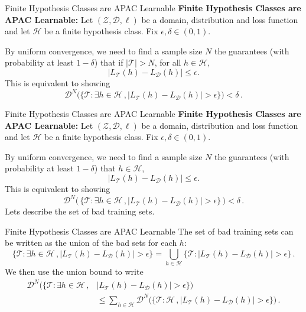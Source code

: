 \documentclass[10pt, table, dvipsnames,handout]{beamer}
\newcommand{\cT}{\ensuremath{\mathcal{T}}}
\newcommand{\cD}{\ensuremath{\mathcal{D}}}
\newcommand{\cH}{\ensuremath{\mathcal{H}}}
\begin{document}
\begin{frame}[fragile]{Finite Hypothesis Classes are APAC Learnable}
\textbf{Finite Hypothesis Classes are APAC Learnable:}
Let $(\mathcal{Z},\cD,\ell)$ be a domain, distribution and loss function and let $\cH$ be a finite hypothesis class. Fix $\epsilon,\delta\in (0,1)$. \pause 

By uniform convergence, we need to find a sample size $N$ the guarantees (with probability at least $1-\delta$) that if $|\mathcal{T}|>N$, for all $h\in \mathcal{H}$, 
$$
|L_\cT(h) - L_\cD(h)|\leq \epsilon.
$$
\pause 
This is equivalent to showing
$$
\cD^N\Big(\big\{\cT:\exists h\in \mathcal{H}\,,|L_\cT(h)-L_\cD(h)|>\epsilon\big\}\Big)<\delta\,.
$$ 
\end{frame}



\begin{frame}[fragile]{Finite Hypothesis Classes are APAC Learnable}
\textbf{Finite Hypothesis Classes are APAC Learnable:}
Let $(\mathcal{Z},\cD,\ell)$ be a domain, distribution and loss function and let $\cH$ be a finite hypothesis class. Fix $\epsilon,\delta\in (0,1)$. 

By uniform convergence, we need to find a sample size $N$ the guarantees (with probability at least $1-\delta$) that $h\in \mathcal{H}$, 
$$
|L_\cT(h) - L_\cD(h)|\leq \epsilon.
$$
This is equivalent to showing
$$
\cD^N\Big(\,\boxed{\big\{\cT:\exists h\in \mathcal{H}\,,|L_\cT(h)-L_\cD(h)|>\epsilon\big\}}\,\Big)<\delta\,.
$$ 
Lets describe the set of bad training sets. 
\end{frame}




\begin{frame}[fragile]{Finite Hypothesis Classes are APAC Learnable}
The set of bad training sets can be written as the union of the bad sets for each $h$: 
$$
\big\{\cT:\exists h\in \mathcal{H}\,,|L_\cT(h)-L_\cD(h)|>\epsilon\big\} = \bigcup_{h\in\cH} \big\{\cT:|L_\cT(h)-L_\cD(h)|>\epsilon\big\}\,.
$$\pause
We then use the union bound to write
\begin{align*}
\cD^N\Big(\big\{\cT:\exists h\in \mathcal{H}\,,&|L_\cT(h)-L_\cD(h)|>\epsilon\big\}\Big)
\\
&\leq \sum_{h\in\cH}\cD^N\Big(\big\{\cT:\mathcal{H}\,,|L_\cT(h)-L_\cD(h)|>\epsilon\big\}\Big)\,.
\end{align*}
\end{frame}
\end{document}
